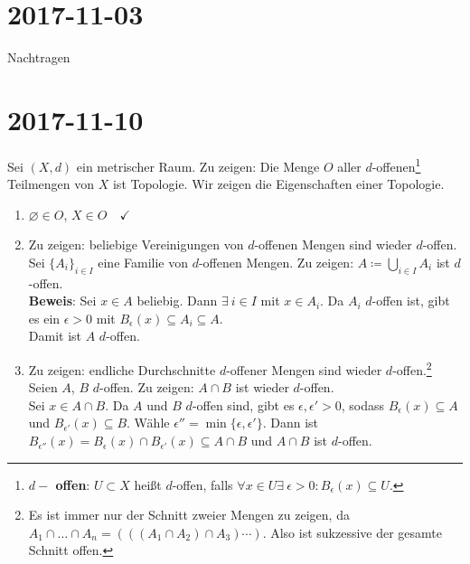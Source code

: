 \section{2017-11-03}
Nachtragen

\section{2017-11-10}

\begin{problem*}[1]
  Sei $ (X, d) $ ein metrischer Raum. Zu zeigen: Die Menge $ O $ aller $ d $-offenen\footnote{\textbf{$ d- $ offen}: $ U \subset X $ heißt $ d $-offen, falls $ \forall x \in U \exists \ \epsilon > 0 : B_\epsilon(x) \subseteq U $.} Teilmengen von $ X $ ist Topologie. Wir zeigen die Eigenschaften einer Topologie.
  \begin{enumerate}
    \item $ \varnothing \in O $, $ X \in O \quad \checkmark $
    \item Zu zeigen: beliebige Vereinigungen von $ d $-offenen Mengen sind wieder $ d $-offen. \\
      Sei $ \{ A_i \}_{ i \in I } $ eine Familie von $ d $-offenen Mengen. Zu zeigen: $ A \coloneqq \bigcup_{i \in I}A_i $ ist $ d $-offen. \\
      \textbf{Beweis}: Sei $ x \in A $ beliebig. Dann $ \exists \ i \in I $ mit $ x \in A_i $. Da $ A_i $ $ d $-offen ist, gibt es ein $ \epsilon > 0 $ mit $ B_\epsilon(x) \subseteq A_i \subseteq A $. \\
      Damit ist $ A $ $ d $-offen.
    \item Zu zeigen: endliche Durchschnitte $ d $-offener Mengen sind wieder $ d $-offen.\footnote{Es ist immer nur der Schnitt zweier Mengen zu zeigen, da $ A_1 \cap \dots \cap A_n = \left( \left( \left( A_1 \cap A_2 \right) \cap A_3 \right) \cdots \right) $. Also ist sukzessive der gesamte Schnitt offen.} \\
    Seien $ A $, $ B $ $ d $-offen. Zu zeigen: $ A \cap B $ ist wieder $ d $-offen. \\
    Sei $ x \in A \cap B $. Da $ A $ und $ B $ $ d $-offen sind, gibt es $ \epsilon, \epsilon' > 0 $, sodass $ B_\epsilon(x) \subseteq A $ und $ B_{\epsilon'}(x) \subseteq B $. Wähle $ \epsilon'' = \min\{ \epsilon, \epsilon' \} $. Dann ist $ B_{\epsilon''}(x) = B_\epsilon(x) \cap B_{\epsilon'}(x) \subseteq A \cap B $ und $ A \cap B $ ist $ d $-offen.
  \end{enumerate}
\end{problem*}

